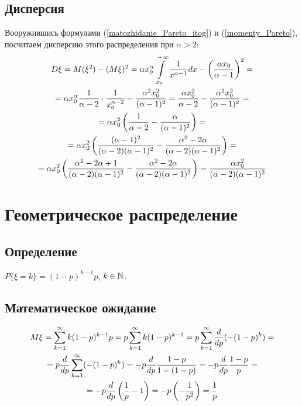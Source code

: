 \subsection{Дисперсия}
Вооружившись формулами (\ref{matozhidanie_Pareto_itog}) и (\ref{momenty_Pareto}), посчитаем дисперсию этого распределения при $\alpha>2$:
\begin{multline}
D\xi=
M(\xi^2)-(M\xi)^2 =
\alpha x_0^\alpha \int\limits_{x_0}^{+\infty} \frac{1}{x^{\alpha-1}} dx - \left(\frac{\alpha x_0}{\alpha-1}\right)^2 =
\\=
\alpha x_0^\alpha \frac{1}{\alpha-2}\cdot\frac{1}{x_0^{\alpha-2}} - \frac{\alpha^2 x_0^2}{(\alpha-1)^2} = 
\frac{\alpha x_0^2}{\alpha-2} - \frac{\alpha^2 x_0^2}{(\alpha-1)^2} = 
\\=
\alpha x_0^2\left(\frac{1}{\alpha-2} - \frac{\alpha}{(\alpha-1)^2}\right) = 
\\=
\alpha x_0^2\left(\frac{(\alpha-1)^2}{(\alpha-2)(\alpha-1)^2} - \frac{\alpha^2-2\alpha}{(\alpha-2)(\alpha-1)^2}\right) =
\\= 
\alpha x_0^2\left(\frac{\alpha^2-2\alpha + 1}{(\alpha-2)(\alpha-1)^2} - \frac{\alpha^2-2\alpha}{(\alpha-2)(\alpha-1)^2}\right) = 
\frac{\alpha x_0^2}{(\alpha-2)(\alpha-1)^2}
\end{multline}

\section{Геометрическое распределение}
\subsection{Определение}
$P\{\xi=k\} = (1-p)^{k-1} p$, $k\in\mathbb{N}$.
\subsection{Математическое ожидание}
\begin{multline}\label{matozhidanie_geom}
M\xi =
\sum\limits_{k=1}^\infty k (1-p)^{k-1} p =
p\sum\limits_{k=1}^\infty k (1-p)^{k-1} =
p\sum\limits_{k=1}^\infty \frac{d}{dp}(-(1-p)^{k}) =
\\=
p\frac{d}{dp} \sum\limits_{k=1}^\infty (-(1-p)^{k}) =
-p\frac{d}{dp} \frac{1-p}{1-(1-p)} = 
-p\frac{d}{dp} \frac{1-p}{p} =
\\=
-p\frac{d}{dp} \left(\frac{1}{p}-1\right) = 
-p\left(-\frac{1}{p^2}\right) =
\frac{1}{p}
\end{multline}


